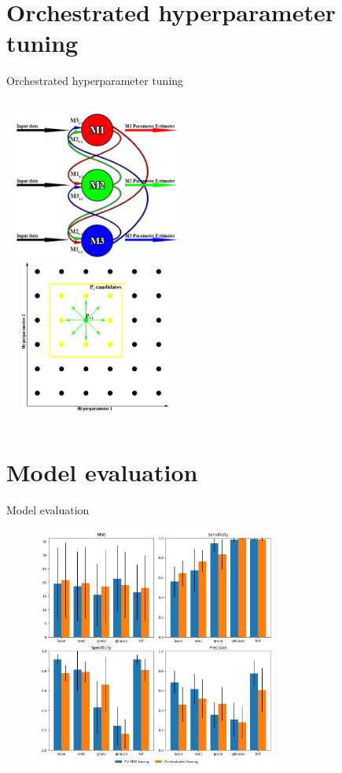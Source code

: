 \documentclass{beamer}
\begin{document}
\section{Orchestrated hyperparameter tuning}
\begin{frame}{Orchestrated hyperparameter tuning}
\begin{columns}[t]
	\centering
	\includegraphics[width=6cm,height=5cm]{orchestrated_tuning_methodology}\\
	\centering
	\includegraphics[width=6cm,height=5cm]{search_grid}\\
\end{columns}
\end{frame}





\section{Model evaluation}
\begin{frame}{Model evaluation}
\begin{figure}
	\includegraphics[width=8cm,height=8cm]{tuning_method_comparison}
\end{figure}
\end{frame}
\end{document}
